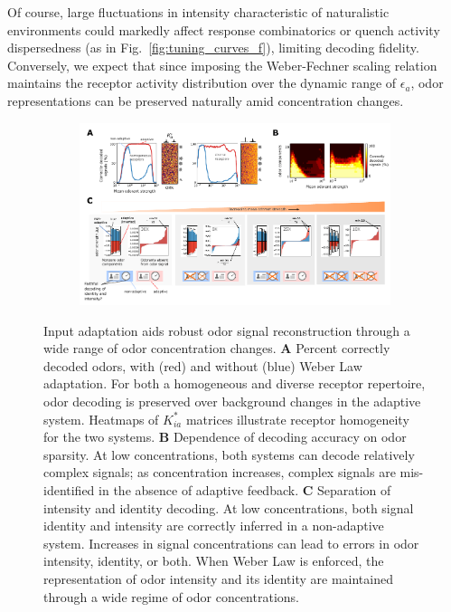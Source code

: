Of course, large fluctuations in intensity characteristic of naturalistic environments could markedly affect response combinatorics or quench activity dispersedness (as in Fig.~\ref{fig:tuning_curves_f}), limiting decoding fidelity. Conversely, we expect that since imposing the Weber-Fechner scaling relation maintains the receptor activity distribution over the dynamic range of $\epsilon_a$, odor representations can be preserved naturally amid concentration changes.







\begin{figure}
	\centering
	\begin{subfigure}[t]{\linewidth}
		\includegraphics[width=\textwidth]{figures/Figures_signal_decoding_weber_law}
		\phantomsubcaption
		\label{fig:decoding_a}
	\end{subfigure}
	\begin{subfigure}[t]{0\linewidth}
		\label{fig:decoding_b}
	\end{subfigure}
	\begin{subfigure}[t]{0\linewidth}
		\label{fig:decoding_c}
	\end{subfigure}
	\caption{\footnotesize{Input adaptation aids robust odor signal reconstruction through a wide range of odor concentration changes. \textbf{A} Percent correctly decoded odors, with (red) and without (blue) Weber Law adaptation. For both a homogeneous and diverse receptor repertoire, odor decoding is preserved over background changes in the adaptive system. Heatmaps of $K^*_{ia}$ matrices illustrate receptor homogeneity for the two systems. \textbf{B} Dependence of decoding accuracy on odor sparsity. At low concentrations, both systems can decode relatively complex signals; as concentration increases, complex signals are mis-identified in the absence of adaptive feedback. \textbf{C} Separation of intensity and identity decoding. At low concentrations, both signal identity and intensity are correctly inferred in a non-adaptive system. Increases in signal concentrations can lead to errors in odor intensity, identity, or both. When Weber Law is enforced, the representation of odor intensity and its identity are maintained through a wide regime of odor concentrations.}}

\end{figure}

